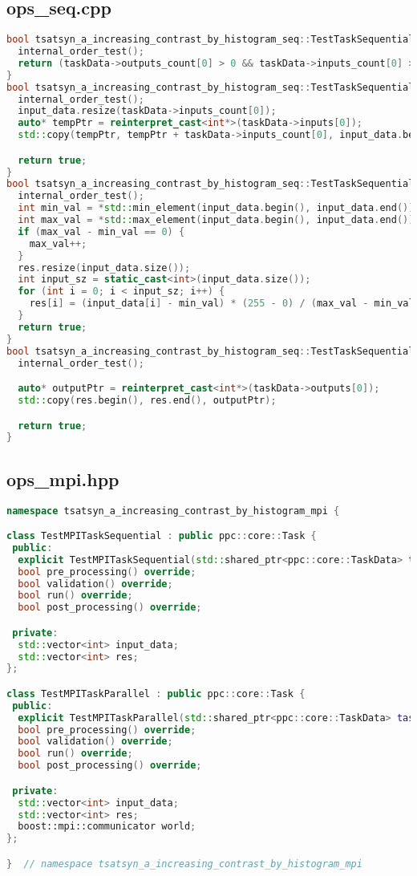 \documentclass[a4paper,12pt]{article}
\begin{document}
\subsection{ops\_seq.cpp}
\begin{lstlisting}[language=C++]
bool tsatsyn_a_increasing_contrast_by_histogram_seq::TestTaskSequential::validation() {
  internal_order_test();
  return (taskData->outputs_count[0] > 0 && taskData->inputs_count[0] > 0);
}
bool tsatsyn_a_increasing_contrast_by_histogram_seq::TestTaskSequential::pre_processing() {
  internal_order_test();
  input_data.resize(taskData->inputs_count[0]);
  auto* tempPtr = reinterpret_cast<int*>(taskData->inputs[0]);
  std::copy(tempPtr, tempPtr + taskData->inputs_count[0], input_data.begin());

  return true;
}
bool tsatsyn_a_increasing_contrast_by_histogram_seq::TestTaskSequential::run() {
  internal_order_test();
  int min_val = *std::min_element(input_data.begin(), input_data.end());
  int max_val = *std::max_element(input_data.begin(), input_data.end());
  if (max_val - min_val == 0) {
    max_val++;
  }
  res.resize(input_data.size());
  int input_sz = static_cast<int>(input_data.size());
  for (int i = 0; i < input_sz; i++) {
    res[i] = (input_data[i] - min_val) * (255 - 0) / (max_val - min_val) + 0;
  }
  return true;
}
bool tsatsyn_a_increasing_contrast_by_histogram_seq::TestTaskSequential::post_processing() {
  internal_order_test();

  auto* outputPtr = reinterpret_cast<int*>(taskData->outputs[0]);
  std::copy(res.begin(), res.end(), outputPtr);

  return true;
}
\end{lstlisting}


\subsection{ops\_mpi.hpp}
\begin{lstlisting}[language=C++]
namespace tsatsyn_a_increasing_contrast_by_histogram_mpi {

class TestMPITaskSequential : public ppc::core::Task {
 public:
  explicit TestMPITaskSequential(std::shared_ptr<ppc::core::TaskData> taskData_) : Task(std::move(taskData_)) {}
  bool pre_processing() override;
  bool validation() override;
  bool run() override;
  bool post_processing() override;

 private:
  std::vector<int> input_data;
  std::vector<int> res;
};

class TestMPITaskParallel : public ppc::core::Task {
 public:
  explicit TestMPITaskParallel(std::shared_ptr<ppc::core::TaskData> taskData_) : Task(std::move(taskData_)) {}
  bool pre_processing() override;
  bool validation() override;
  bool run() override;
  bool post_processing() override;

 private:
  std::vector<int> input_data;
  std::vector<int> res;
  boost::mpi::communicator world;
};

}  // namespace tsatsyn_a_increasing_contrast_by_histogram_mpi
\end{lstlisting}
\end{document}
